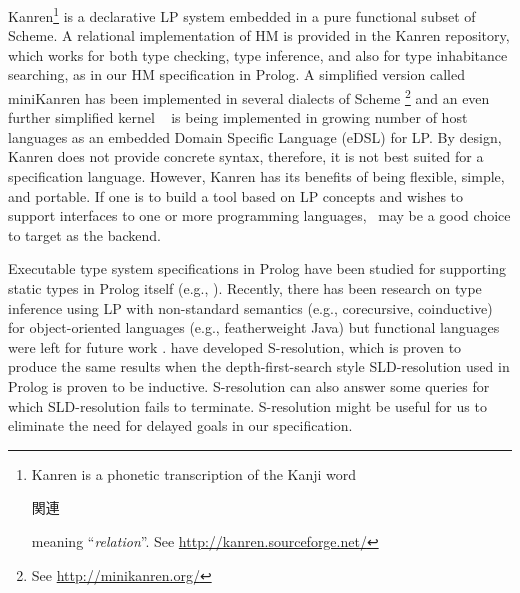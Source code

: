 Kanren\footnote{ Kanren is a phonetic transcription of the Kanji word
	\begin{CJK}{UTF8}{min}{関連}\end{CJK} meaning ``\emph{relation}''.
	See \url{http://kanren.sourceforge.net/} } \cite{ReasonedSchemer}
is a declarative LP system embedded in a pure functional subset of Scheme.
A relational implementation of HM is provided in
the Kanren repository,%
which works for both type checking, type inference, and also for
type inhabitance searching, as in our HM specification in Prolog.
A simplified version called miniKanren \cite{minikanrenThesis} has been
implemented in several dialects of Scheme
\footnote{See \url{http://minikanren.org/} }
and an even further simplified kernel \muKanren\ \cite{microKanren}
is being implemented in growing number of host languages as
an embedded Domain Specific Language (eDSL) for LP. By design, Kanren
does not provide concrete syntax, therefore, it is not best suited for
a specification language. However, Kanren has its benefits of being
flexible, simple, and portable. If one is to build a tool based on LP concepts
and wishes to support interfaces to one or more programming languages,
\muKanren\ may be a good choice to target as the backend.

Executable type system specifications in Prolog have been studied for supporting
static types in Prolog itself (e.g., \cite{SchrijversCWD08}). Recently, there
has been research on type inference using LP with non-standard semantics (e.g.,
corecursive, coinductive) for object-oriented languages (e.g., featherweight
Java) but functional languages were left for future work \cite{AL-ECOOP09}.
\citet{SRLP15} have developed S-resolution, which is proven \cite{PCR15} to
produce the same results when the depth-first-search style SLD-resolution
used in Prolog is proven to be inductive. S-resolution can also answer
some queries for which SLD-resolution fails to terminate.
S-resolution might be useful for us to eliminate the need for delayed goals
in our specification.

